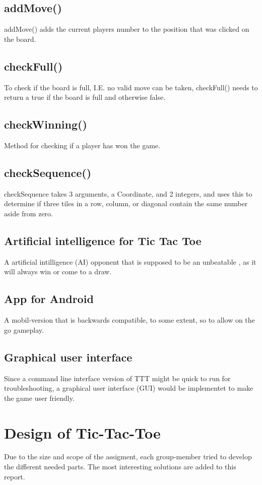 \documentclass[a4paper,10pt]{article}
\begin{document}
	\subsection{addMove()}
	addMove() adds the current players number to the position that was clicked on the board.
	\subsection{checkFull()}
	To check if the board is full, I.E. no valid move can be taken, checkFull() needs to return a true if the board is full and otherwise false.
	\subsection{checkWinning()}
	Method for checking if a player has won the game. 
	\subsection{checkSequence()}
	checkSequence takes 3 arguments, a Coordinate, and 2 integers, and uses this to determine if three tiles in a row, column, or diagonal contain the same number aside from zero.
	\subsection{Artificial intelligence for Tic Tac Toe}
	A artificial intilligence (AI) opponent that is supposed to be an unbeatable , as it will always win or come to a draw. 
	\subsection{App for Android}
	A mobil-version that is backwards compatible, to some extent, so to allow on the go gameplay.
	\subsection{Graphical user interface}
	Since a command line interface version of TTT might be quick to run for troubleshooting, a graphical user interface (GUI) would be implementet to make the game user friendly.
	
	\section{Design of Tic-Tac-Toe}
	Due to the size and scope of the assigment, each group-member tried to develop the different needed parts. The most interesting solutions are added to this report.
\end{document}
